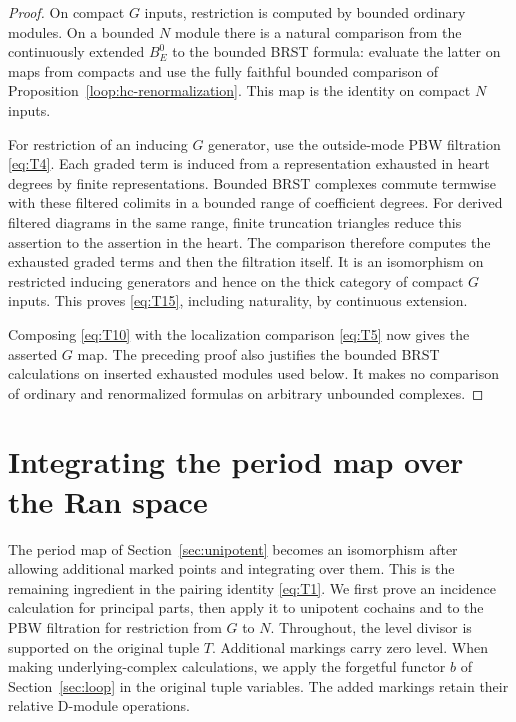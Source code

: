 \documentclass[11pt]{article}
\numberwithin{equation}{section}
\theoremstyle{definition}
\theoremstyle{remark}
\begin{document}
\begin{proof}
On compact $G$ inputs, restriction is computed by bounded ordinary
modules.  On a bounded $N$ module there is a natural comparison from
the continuously extended $B_E^0$ to the bounded BRST formula:
evaluate the latter on maps from compacts and use the fully faithful
bounded comparison of
Proposition~\ref{loop:hc-renormalization}.  This map is the identity on
compact $N$ inputs.

For restriction of an inducing $G$ generator, use the outside-mode
PBW filtration \eqref{eq:T4}.  Each graded term is induced from a
representation exhausted in heart degrees by finite representations.
Bounded BRST complexes commute termwise with these filtered colimits
in a bounded range of coefficient degrees.  For derived filtered
diagrams in the same range, finite truncation triangles reduce this
assertion to the assertion in the heart.  The comparison therefore
computes the exhausted graded terms and then the filtration itself.
It is an isomorphism on restricted inducing generators and hence on
the thick category of compact $G$ inputs.  This proves
\eqref{eq:T15}, including naturality, by continuous extension.

Composing \eqref{eq:T10} with the localization comparison
\eqref{eq:T5} now gives the asserted $G$ map.  The preceding proof
also justifies the bounded BRST calculations on inserted exhausted
modules used below.  It makes no comparison of ordinary and
renormalized formulas on arbitrary unbounded complexes.
\end{proof}

\section{Integrating the period map over the Ran space}
\label{sec:ran}

The period map of Section~\ref{sec:unipotent} becomes an isomorphism after
allowing additional marked points and integrating over them.  This is the
remaining ingredient in the pairing identity \eqref{eq:T1}.  We first prove
an incidence calculation for principal parts, then apply it to unipotent
cochains and to the PBW filtration for restriction from $G$ to $N$.
Throughout, the level divisor is supported on the original tuple $T$.
Additional markings carry zero level.  When making underlying-complex
calculations, we apply the forgetful functor $b$ of
Section~\ref{sec:loop} in the original tuple variables.  The added
markings retain their relative D-module operations.
\end{document}
